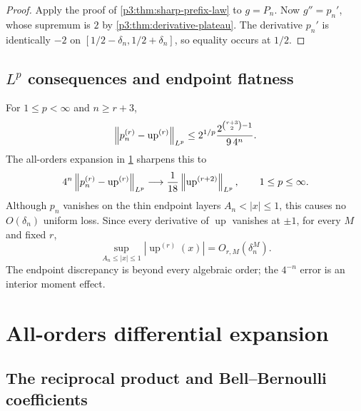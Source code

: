 \documentclass[11pt,oneside]{article}
\numberwithin{equation}{section}
\theoremstyle{definition}
\theoremstyle{remark}
\newcommand{\Up}{\operatorname{up}}
\begin{document}
\begin{proof}
Apply the proof of \cref{p3:thm:sharp-prefix-law} to $g=P_n$.  Now
$g''=p_n'$, whose supremum is $2$ by \cref{p3:thm:derivative-plateau}.  The derivative
$p_n'$ is identically $-2$ on
$[1/2-\delta_n,1/2+\delta_n]$, so equality occurs at $1/2$.
\end{proof}

\subsection{$L^p$ consequences and endpoint flatness}

For $1\le p<\infty$ and $n\ge r+3$,
\begin{equation}
 \norm{p_n^{(r)}-\Up^{(r)}}_{L^p}
 \le 2^{1/p}\frac{2^{\binom{r+3}{2}-1}}{9\,4^n}.
 \label{p3:eq:lp-upper}
\end{equation}
The all-orders expansion in \cref{p3:sec:all-orders} sharpens this to
\begin{equation}
 4^n\norm{p_n^{(r)}-\Up^{(r)}}_{L^p}
 \longrightarrow \frac1{18}\norm{\Up^{(r+2)}}_{L^p},
 \qquad 1\le p\le\infty.
 \label{p3:eq:lp-asymptotic}
\end{equation}
Although $p_n$ vanishes on the thin endpoint layers
$A_n<|x|\le1$, this causes no $O(\delta_n)$ uniform loss.  Since every derivative of
$\Up$ vanishes at $\pm1$, for every $M$ and fixed $r$,
\begin{equation}
 \sup_{A_n\le|x|\le1}|\Up^{(r)}(x)|=O_{r,M}(\delta_n^M).
 \label{p3:eq:endpoint-superalgebraic}
\end{equation}
The endpoint discrepancy is beyond every algebraic order; the $4^{-n}$ error is an
interior moment effect.

\section{All-orders differential expansion}
\label{p3:sec:all-orders}

\subsection{The reciprocal product and Bell--Bernoulli coefficients}
\end{document}
